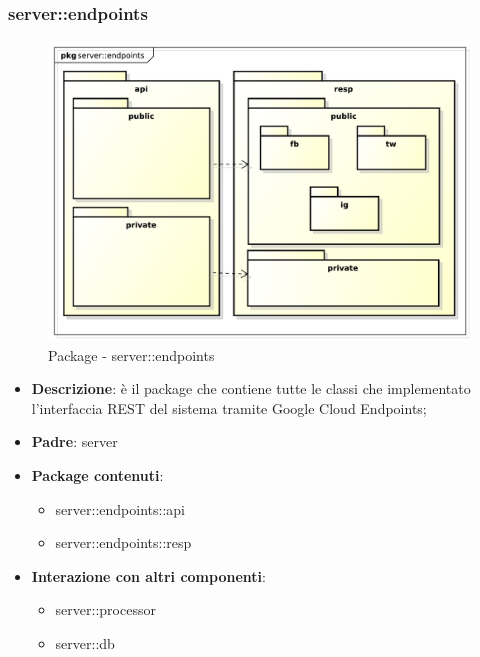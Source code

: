 


\subsubsection{server::endpoints} %
\label{ssub:bdsm_app_server_endpoints}
\begin{figure}[!htbp]
	\centering
	\centerline{\includegraphics[scale=0.6]{./images/server/endpoints.pdf}}
	\caption{Package - server::endpoints}
\end{figure}

\begin{itemize}
  \item \textbf{Descrizione}: è il package che contiene tutte le classi che implementato l'interfaccia REST del sistema tramite Google Cloud Endpoints;
  \item \textbf{Padre}: server
  \item \textbf{Package contenuti}:
  	\begin{itemize}
  		\item server::endpoints::api
  		\item server::endpoints::resp
	\end{itemize}
  \item \textbf{Interazione con altri componenti}:
  	\begin{itemize}
  		\item server::processor
  		\item server::db
	\end{itemize}
\end{itemize}

